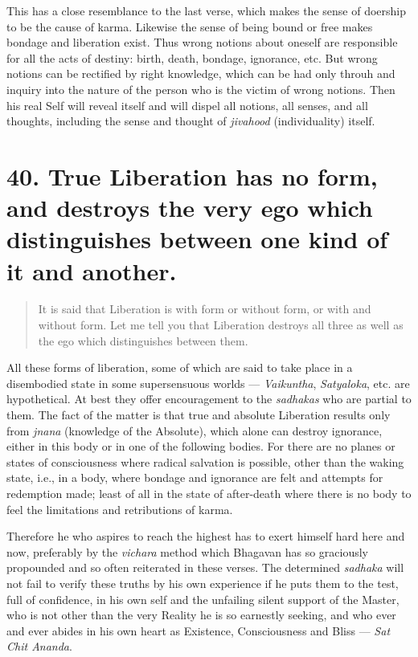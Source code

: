 \documentclass[12pt]{report}
\begin{document}

This has a close resemblance to the last verse, which makes the sense
of doership to be the cause of karma. Likewise the sense of being
bound or free makes bondage and liberation exist. Thus wrong notions
about oneself are responsible for all the acts of destiny: birth,
death, bondage, ignorance, etc. But wrong notions can be rectified by
right knowledge, which can be had only throuh and inquiry into the
nature of the person who is the victim of wrong notions. Then his real
Self will reveal itself and will dispel all notions, all senses, and
all thoughts, including the sense and thought of \emph{jivahood}
(individuality) itself.

\section{40. True Liberation has no form, and destroys the very ego
  which distinguishes between one kind of it and another.}

\begin{quote}
  It is said that Liberation is with form or without form, or with and
  without form. Let me tell you that Liberation destroys all three as
  well as the ego which distinguishes between them.
\end{quote}


All these forms of liberation, some of which are said to take place in
a disembodied state in some supersensuous worlds --- \emph{Vaikuntha},
\emph{Satyaloka}, etc. are hypothetical. At best they offer
encouragement to the \emph{sadhakas} who are partial to them. The fact
of the matter is that true and absolute Liberation results only from
\emph{jnana} (knowledge of the Absolute), which alone can destroy
ignorance, either in this body or in one of the following bodies. For
there are no planes or states of consciousness where radical salvation
is possible, other than the waking state, i.e., in a body, where
bondage and ignorance are felt and attempts for redemption made; least
of all in the state of after-death where there is no body to feel the
limitations and retributions of karma.

Therefore he who aspires to reach the highest has to exert himself
hard here and now, preferably by the \emph{vichara} method which
Bhagavan has so graciously propounded and so often reiterated in these
verses. The determined \emph{sadhaka} will not fail to verify these
truths by his own experience if he puts them to the test, full of
confidence, in his own self and the unfailing silent support of the
Master, who is not other than the very Reality he is so earnestly
seeking, and who ever and ever abides in his own heart as Existence,
Consciousness and Bliss --- \emph{Sat Chit Ananda}.
\end{document}
